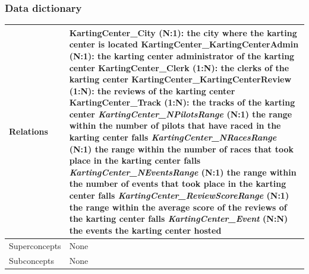 \documentclass{beamer}
\begin{document}
\begin{frame}
\frametitle{Data dictionary}
\begin{table}
\tiny
\begin{tabular}{|p{2cm}|p{6cm}|}
\hline
Relations &
KartingCenter\_City (N:1): the city where the karting center is located \newline
KartingCenter\_KartingCenterAdmin (N:1): the karting center administrator of the karting center \newline
KartingCenter\_Clerk (1:N): the clerks of the karting center \newline
KartingCenter\_KartingCenterReview (1:N): the reviews of the karting center \newline
KartingCenter\_Track (1:N): the tracks of the karting center \newline
\textit{KartingCenter\_NPilotsRange} (N:1) the range within the number of pilots that have raced in the karting center falls \newline
\textit{KartingCenter\_NRacesRange} (N:1) the range within the number of races that took place in the karting center falls \newline
\textit{KartingCenter\_NEventsRange} (N:1) the range within the number of events that took place in the karting center falls \newline
\textit{KartingCenter\_ReviewScoreRange} (N:1) the range within the average score of the reviews of the karting center falls \newline
\textit{KartingCenter\_Event} (N:N) the events the karting center hosted \\
\hline
Superconcepts & None \\
\hline
Subconcepts & None \\
\hline
\end{tabular}
\end{table}
\end{frame}
\end{document}
